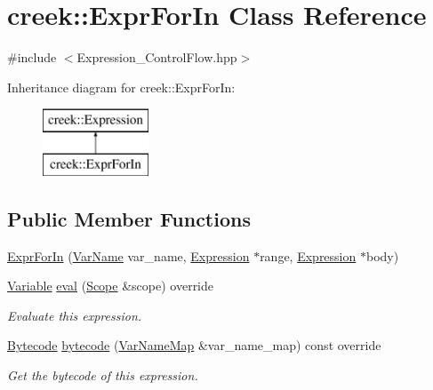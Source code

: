 \hypertarget{classcreek_1_1_expr_for_in}{}\section{creek\+:\+:Expr\+For\+In Class Reference}
\label{classcreek_1_1_expr_for_in}


{\ttfamily \#include $<$Expression\+\_\+\+Control\+Flow.\+hpp$>$}

Inheritance diagram for creek\+:\+:Expr\+For\+In\+:\begin{figure}[H]
\begin{center}
\leavevmode
\includegraphics[height=2.000000cm]{classcreek_1_1_expr_for_in}
\end{center}
\end{figure}
\subsection*{Public Member Functions}
\begin{DoxyCompactItemize}
\item 
\hyperlink{classcreek_1_1_expr_for_in_aa1878abf03240778957f7b3ebcff68f5}{Expr\+For\+In} (\hyperlink{classcreek_1_1_var_name}{Var\+Name} var\+\_\+name, \hyperlink{classcreek_1_1_expression}{Expression} $\ast$range, \hyperlink{classcreek_1_1_expression}{Expression} $\ast$body)
\item 
\hyperlink{classcreek_1_1_variable}{Variable} \hyperlink{classcreek_1_1_expr_for_in_a1ca1a4d1be979565174184945d7ed8ff}{eval} (\hyperlink{classcreek_1_1_scope}{Scope} \&scope) override
\begin{DoxyCompactList}\small\item\em Evaluate this expression. \end{DoxyCompactList}\item 
\hyperlink{classcreek_1_1_bytecode}{Bytecode} \hyperlink{classcreek_1_1_expr_for_in_a67aab389d085f616822e45f2a4b14ac3}{bytecode} (\hyperlink{classcreek_1_1_var_name_map}{Var\+Name\+Map} \&var\+\_\+name\+\_\+map) const  override\hypertarget{classcreek_1_1_expr_for_in_a67aab389d085f616822e45f2a4b14ac3}{}\label{classcreek_1_1_expr_for_in_a67aab389d085f616822e45f2a4b14ac3}

\begin{DoxyCompactList}\small\item\em Get the bytecode of this expression. \end{DoxyCompactList}\end{DoxyCompactItemize}


